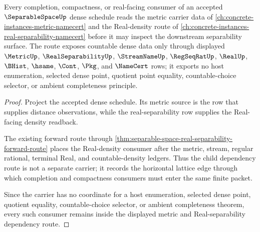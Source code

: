 \begin{theorem}
\label{thm:separable-space-real-metric-dependency-route}
Every completion, compactness, or real-facing consumer of an accepted $\SeparableSpaceUp$ dense schedule reads the metric carrier data of \autoref{ch:concrete-instances-metric-namecert} and the Real-density route of \autoref{ch:concrete-instances-real-separability-namecert} before it may inspect the downstream separability surface. The route exposes countable dense data only through displayed $\MetricUp$, $\RealSeparabilityUp$, $\StreamNameUp$, $\RegSeqRatUp$, $\RealUp$, $\BHist$, $\hsame$, $\Cont$, $\Pkg$, and $\NameCert$ rows; it exports no host enumeration, selected dense point, quotient point equality, countable-choice selector, or ambient completeness principle.
\end{theorem}
\begin{proof}
Project the accepted dense schedule. Its metric source is the row that supplies distance observations, while the real-separability row supplies the Real-facing density readback.

The existing forward route through \autoref{thm:separable-space-real-separability-forward-route} places the Real-density consumer after the metric, stream, regular rational, terminal Real, and countable-density ledgers. Thus the child dependency route is not a separate carrier; it records the horizontal lattice edge through which completion and compactness consumers must enter the same finite packet.

Since the carrier has no coordinate for a host enumeration, selected dense point, quotient equality, countable-choice selector, or ambient completeness theorem, every such consumer remains inside the displayed metric and Real-separability dependency route.
\end{proof}
